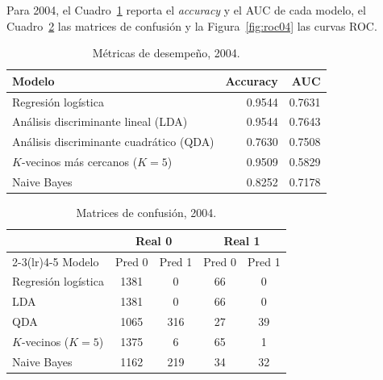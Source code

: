 \documentclass[11pt,a4paper]{article}
\begin{document}
Para 2004, el Cuadro~\ref{tab:metricas04} reporta el \textit{accuracy} y el AUC de cada
modelo, el Cuadro~\ref{tab:cm04} las matrices de confusión y la Figura~\ref{fig:roc04} las
curvas ROC.

\begin{table}[H]
  \centering
  \caption{Métricas de desempeño, 2004.}
  \label{tab:metricas04}
  \begin{tabular}{lrr}
    \toprule
    Modelo & Accuracy & AUC \\
    \midrule
    Regresión logística                      & 0.9544 & 0.7631 \\
    Análisis discriminante lineal (LDA)      & 0.9544 & 0.7643 \\
    Análisis discriminante cuadrático (QDA)  & 0.7630 & 0.7508 \\
    $K$-vecinos más cercanos ($K=5$)         & 0.9509 & 0.5829 \\
    Naive Bayes                              & 0.8252 & 0.7178 \\
    \bottomrule
  \end{tabular}
\end{table}

\begin{table}[H]
  \centering
  \caption{Matrices de confusión, 2004.}
  \label{tab:cm04}
  \begin{tabular}{lcccc}
    \toprule
    & \multicolumn{2}{c}{Real 0} & \multicolumn{2}{c}{Real 1} \\
    \cmidrule(lr){2-3}\cmidrule(lr){4-5}
    Modelo & Pred 0 & Pred 1 & Pred 0 & Pred 1 \\
    \midrule
    Regresión logística              & 1381 &   0 & 66 &  0 \\
    LDA                              & 1381 &   0 & 66 &  0 \\
    QDA                              & 1065 & 316 & 27 & 39 \\
    $K$-vecinos ($K=5$)              & 1375 &   6 & 65 &  1 \\
    Naive Bayes                      & 1162 & 219 & 34 & 32 \\
    \bottomrule
  \end{tabular}
\end{table}
\end{document}

